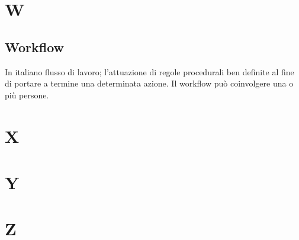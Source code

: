 \clearpage
\section*{W}

\subsection*{Workflow}
In italiano flusso di lavoro; l'attuazione di regole procedurali ben definite al fine di portare a termine una determinata azione. Il workflow può coinvolgere una o più persone.

\clearpage
\section*{X}

\clearpage
\section*{Y}

\clearpage
\section*{Z}